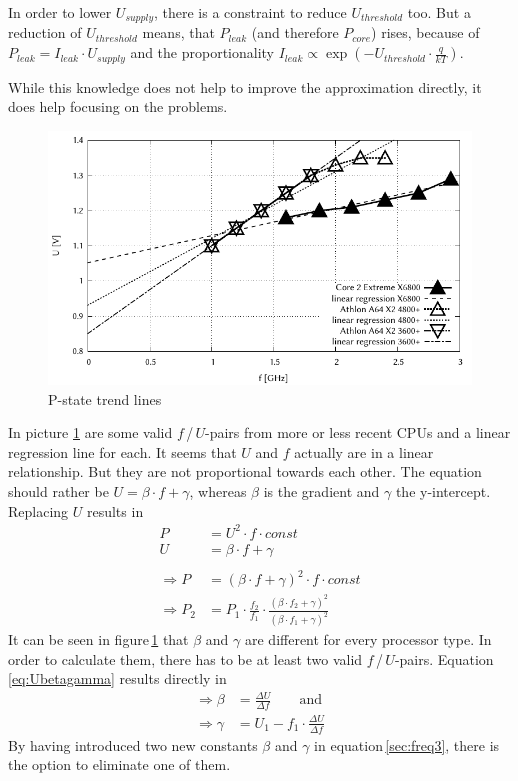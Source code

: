 In order to lower $U_{supply}$, there is a constraint to reduce $U_{threshold}$ too. But a reduction of $U_{threshold}$ means, that $P_{leak}$ (and therefore $P_{core}$) rises, because of $P_{leak} = I_{leak} \cdot U_{supply}$ and the proportionality $I_{leak} \propto \exp(−U_{threshold} \cdot \frac{q}{kT})$\cite{vt}.

While this knowledge does not help to improve the approximation directly, it does help focusing on the problems.
%
\begin{figure}[h]
	\centering
	\includegraphics[width=\linewidth]{pix/pstates/pstates}
	\caption{P-state trend lines}
	\label{fig:pstates}
\end{figure}

In picture \ref{fig:pstates} are some valid $f$\,/\,$U$-pairs from more or less recent CPUs and a linear regression line for each.
It seems that $U$ and $f$ actually are in a linear relationship. But they are not proportional towards each other. The equation should rather be $U = \beta \cdot f + \gamma$, whereas $\beta$ is the gradient and $\gamma$ the y-intercept. Replacing $U$ results in
%
\begin{align}
	P &= U^2 \cdot f \cdot const \nonumber \\
	U &= \beta \cdot f + \gamma \label{eq:Ubetagamma}\\
	\nonumber \\
	\Rightarrow P &= (\beta \cdot f + \gamma)^2 \cdot f \cdot const \nonumber \\
	\Rightarrow P_{2} &= P_{1} \cdot \frac{f_2}{f_1} \cdot \frac{(\beta \cdot f_2 + \gamma)^2}{(\beta \cdot f_1 + \gamma)^2}
\end{align}
%
It can be seen in figure\,\ref{fig:pstates} that $\beta$ and $\gamma$ are different for every processor type. In order to calculate them, there has to be at least two valid $f$\,/\,$U$-pairs. Equation\,\eqref{eq:Ubetagamma} results directly in
%
\begin{align}
	\Rightarrow \beta &= \frac{\Delta U}{\Delta f} \qquad\text{and}\\
	\Rightarrow \gamma &= U_1 - f_1 \cdot \frac{\Delta U}{\Delta f}
\end{align}
%
By having introduced two new constants $\beta$ and $\gamma$ in equation\,\eqref{sec:freq3}, there is the option to eliminate one of them. 

